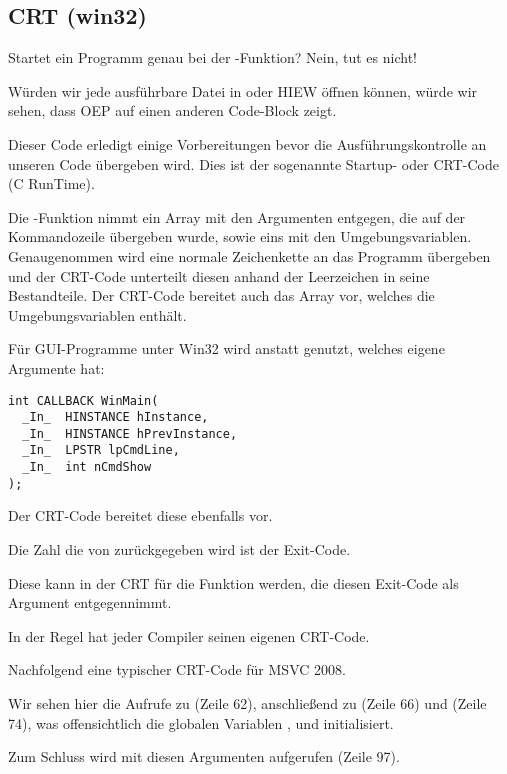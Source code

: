 \subsection{CRT (win32)}
\label{sec:CRT}

Startet ein Programm genau bei der \main{}-Funktion?
Nein, tut es nicht!

Würden wir jede ausführbare Datei in \IDA oder HIEW öffnen können, würde wir sehen,
dass \ac{OEP} auf einen anderen Code-Block zeigt.

Dieser Code erledigt einige Vorbereitungen bevor die Ausführungskontrolle an unseren
Code übergeben wird.
Dies ist der sogenannte Startup- oder CRT-Code (C RunTime).

Die \main{}-Funktion nimmt ein Array mit den Argumenten entgegen, die auf der Kommandozeile
übergeben wurde, sowie eins mit den Umgebungsvariablen.
Genaugenommen wird eine normale Zeichenkette an das Programm übergeben und der CRT-Code
unterteilt diesen anhand der Leerzeichen in seine Bestandteile.
Der CRT-Code bereitet auch das Array  vor, welches die Umgebungsvariablen enthält.

Für \ac{GUI}-Programme unter Win32 wird  anstatt \main{} genutzt, welches eigene
Argumente hat:

\begin{lstlisting}
int CALLBACK WinMain(
  _In_  HINSTANCE hInstance,
  _In_  HINSTANCE hPrevInstance,
  _In_  LPSTR lpCmdLine,
  _In_  int nCmdShow
);
\end{lstlisting}

Der CRT-Code bereitet diese ebenfalls vor.

Die Zahl die von \main{} zurückgegeben wird ist der Exit-Code.

Diese kann in der CRT für die Funktion  werden, die diesen Exit-Code als
Argument entgegennimmt.

In der Regel hat jeder Compiler seinen eigenen CRT-Code.

Nachfolgend eine typischer CRT-Code für MSVC 2008.



Wir sehen hier die Aufrufe zu  (Zeile 62), anschließend zu 
(Zeile 66) und  (Zeile 74), was offensichtlich die globalen Variablen ,
 und   initialisiert.

Zum Schluss wird \main{} mit diesen Argumenten aufgerufen (Zeile 97).

